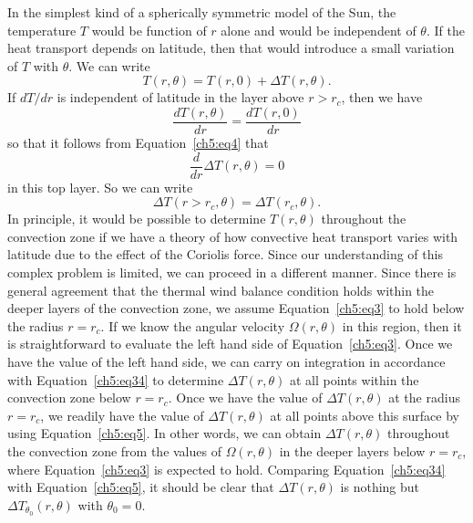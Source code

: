 In the simplest kind of a spherically symmetric model of the Sun, the
temperature $T$ would be function of $r$ alone and would be independent of
$\theta$.  If the heat transport depends on latitude, then that would introduce
a small variation of $T$ with $\theta$. We can write
\begin{equation}
T(r, \theta) = T (r, 0) + \Delta T (r, \theta).
\label{ch5:eq4}
\end{equation}
If $d T/ dr$ is independent of latitude in the layer above $r > r_c$, then we have
\begin{equation}
\frac{dT (r,\theta)}{dr} = \frac{dT (r,0)}{dr} \nonumber
\end{equation}
so that it follows from Equation~\ref{ch5:eq4} that
\begin{equation}
\frac{d}{dr} \Delta T (r, \theta)= 0 \nonumber
\end{equation}
in this top layer.  So we can write
\begin{equation}
\Delta T (r > r_c, \theta) = \Delta T (r_c, \theta).
\label{ch5:eq5}
\end{equation}
%
In principle, it would be possible to determine $T (r, \theta)$ throughout the convection zone if we have a theory of how convective heat transport varies with latitude due to the effect of the Coriolis force.  Since our understanding of this complex problem is limited, we can proceed in a different manner. Since there is general agreement that the thermal wind balance condition holds within the deeper layers of the convection zone, we assume Equation~\ref{ch5:eq3} to hold below the radius $r = r_c$.  If we know the angular velocity $\Omega (r, \theta)$ in this region, then it is straightforward to evaluate the left hand side of Equation~\ref{ch5:eq3}.  Once we have the value of the left hand side, we can carry on integration
in accordance with Equation~\ref{ch5:eq34} to determine $\Delta T (r, \theta)$ at all points within the convection zone below $ r = r_c$. Once we have the value of $\Delta T (r, \theta)$ at the radius $r = r_c$, we readily have the value of $\Delta T (r, \theta)$ at all points above this surface by using Equation~\ref{ch5:eq5}.  In other words, we can obtain $\Delta T (r, \theta)$ throughout the convection zone from the values of $\Omega (r, \theta)$ in the deeper layers below $r = r_c$, where Equation~\ref{ch5:eq3} is expected to hold.  Comparing Equation~\ref{ch5:eq34} with Equation~\ref{ch5:eq5}, it should be clear
that $\Delta T (r, \theta)$ is nothing but $\Delta T_{\theta_0} (r, \theta)$ with $\theta_0 = 0$.

